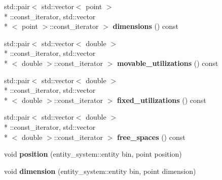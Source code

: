 \begin{DoxyCompactItemize}
\item 
\hypertarget{classophidian_1_1density_1_1bins_af8b8ea7c565b4f9f971d002c8eff205c}{std\-::pair$<$ std\-::vector$<$ point $>$\\*
\-::const\-\_\-iterator, std\-::vector\\*
$<$ point $>$\-::const\-\_\-iterator $>$ {\bfseries dimensions} () const }\label{classophidian_1_1density_1_1bins_af8b8ea7c565b4f9f971d002c8eff205c}

\item 
\hypertarget{classophidian_1_1density_1_1bins_ad124f56918f90692022862f0fb102ddd}{std\-::pair$<$ std\-::vector$<$ double $>$\\*
\-::const\-\_\-iterator, std\-::vector\\*
$<$ double $>$\-::const\-\_\-iterator $>$ {\bfseries movable\-\_\-utilizations} () const }\label{classophidian_1_1density_1_1bins_ad124f56918f90692022862f0fb102ddd}

\item 
\hypertarget{classophidian_1_1density_1_1bins_a61419b51062f3038bc7c7aa478d98d01}{std\-::pair$<$ std\-::vector$<$ double $>$\\*
\-::const\-\_\-iterator, std\-::vector\\*
$<$ double $>$\-::const\-\_\-iterator $>$ {\bfseries fixed\-\_\-utilizations} () const }\label{classophidian_1_1density_1_1bins_a61419b51062f3038bc7c7aa478d98d01}

\item 
\hypertarget{classophidian_1_1density_1_1bins_ab42f5aad4307030e772e0af541bcd99b}{std\-::pair$<$ std\-::vector$<$ double $>$\\*
\-::const\-\_\-iterator, std\-::vector\\*
$<$ double $>$\-::const\-\_\-iterator $>$ {\bfseries free\-\_\-spaces} () const }\label{classophidian_1_1density_1_1bins_ab42f5aad4307030e772e0af541bcd99b}

\item 
\hypertarget{classophidian_1_1density_1_1bins_aad3fa868d07dc61e65980ee32663d976}{void {\bfseries position} (entity\-\_\-system\-::entity bin, point position)}\label{classophidian_1_1density_1_1bins_aad3fa868d07dc61e65980ee32663d976}

\item 
\hypertarget{classophidian_1_1density_1_1bins_a9c8d9f93827bc76c6d0ee3c4a8c532ed}{void {\bfseries dimension} (entity\-\_\-system\-::entity bin, point dimension)}\label{classophidian_1_1density_1_1bins_a9c8d9f93827bc76c6d0ee3c4a8c532ed}


\end{DoxyCompactItemize}
